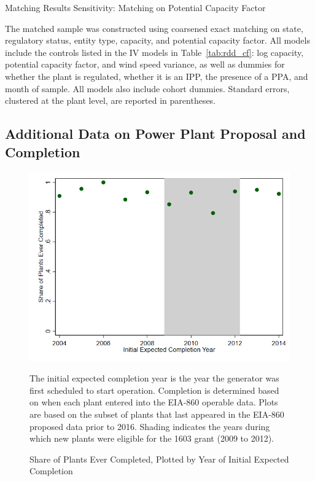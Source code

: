\documentclass[12pt]{article}
\begin{document}
\begin{table}[h]
\caption{Matching Results Sensitivity: Matching on Potential Capacity Factor \label{tab:matching_group_ptnlcf}}
\begin{center}

\end{center}
\footnotesize
The matched sample was constructed using coarsened exact matching on state, regulatory status, entity type, capacity, and potential capacity factor. All models include the controls listed in the IV models in Table~\ref{tab:rdd_cf}: log capacity, potential capacity factor, and wind speed variance, as well as dummies for whether the plant is regulated, whether it is an IPP, the presence of a PPA, and month of sample. All models also include cohort dummies. Standard errors, clustered at the plant level, are reported in parentheses.
\end{table}

\subsection{Additional Data on Power Plant Proposal and Completion}

\begin{figure}[h]
\caption{Share of Plants Ever Completed, Plotted by Year of Initial Expected Completion\label{fig:proposed_ever_completed}}
\vspace{-15pt}
\begin{center}
\includegraphics[width=0.75\linewidth]{proposal_data_ever_completed.png}
\end{center}
\vspace{-15pt}
\footnotesize
The initial expected completion year is the year the generator was first scheduled to start operation. Completion is determined based on when each plant entered into the EIA-860 operable data. Plots are based on the subset of plants that last appeared in the EIA-860 proposed data prior to 2016. Shading indicates the years during which new plants were eligible for the 1603 grant (2009 to 2012).
\end{figure}

\clearpage


\end{document}
